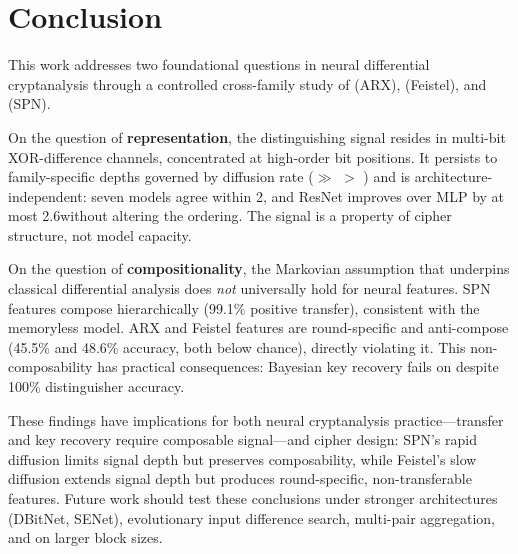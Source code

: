 \section{Conclusion}
\label{sec:conclusion}

This work addresses two foundational questions in neural differential cryptanalysis through a controlled cross-family study of \speck (ARX), \simon (Feistel), and \present (SPN).

On the question of \textbf{representation}, the distinguishing signal resides in multi-bit XOR-difference channels, concentrated at high-order bit positions.
It persists to family-specific depths governed by diffusion rate (\simon $\gg$ \speck $>$ \present) and is architecture-independent: seven models agree within 2\pp, and ResNet improves over MLP by at most 2.6\pp without altering the ordering.
The signal is a property of cipher structure, not model capacity.

On the question of \textbf{compositionality}, the Markovian assumption that underpins classical differential analysis does \emph{not} universally hold for neural features.
SPN features compose hierarchically (99.1\% positive transfer), consistent with the memoryless model.
ARX and Feistel features are round-specific and anti-compose (45.5\% and 48.6\% accuracy, both below chance), directly violating it.
This non-composability has practical consequences: Bayesian key recovery fails on \simon despite 100\% distinguisher accuracy.

These findings have implications for both neural cryptanalysis practice---transfer and key recovery require composable signal---and cipher design: SPN's rapid diffusion limits signal depth but preserves composability, while Feistel's slow diffusion extends signal depth but produces round-specific, non-transferable features.
Future work should test these conclusions under stronger architectures (DBitNet, SENet), evolutionary input difference search, multi-pair aggregation, and on larger block sizes.
